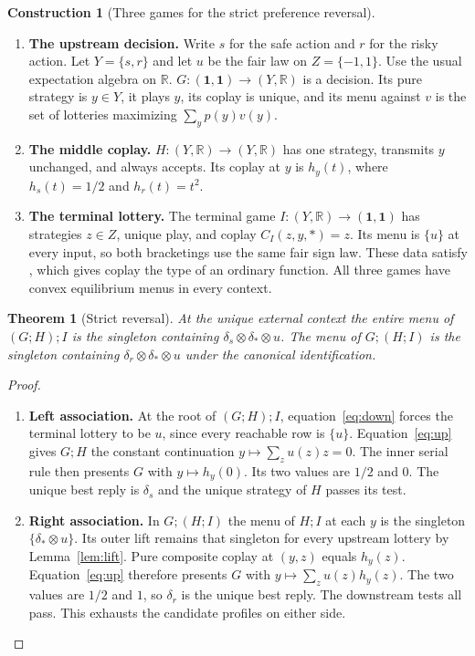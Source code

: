 \documentclass[11pt,a4paper]{article}
\newtheorem{theorem}{Theorem}[section]
\theoremstyle{definition}
\newtheorem*{construction}{Construction}
\newcommand{\one}{\mathbf 1}
\begin{document}
\begin{construction}[Three games for the strict preference reversal]\leavevmode
    \begin{enumerate}[titledsteps]
        \item \textbf{The upstream decision.} Write $s$ for the safe action and $r$ for the risky action. Let $Y=\{s,r\}$ and let $u$ be the fair law on $Z=\{-1,1\}$. Use the usual expectation algebra on $\mathbb R$. $G:(\one,\one)\to(Y,\mathbb R)$ is a decision. Its pure strategy is $y\in Y$, it plays $y$, its coplay is unique, and its menu against $v$ is the set of lotteries maximizing $\sum_y p(y)v(y)$.

        \item \textbf{The middle coplay.} $H:(Y,\mathbb R)\to(Y,\mathbb R)$ has one strategy, transmits $y$ unchanged, and always accepts. Its coplay at $y$ is $h_y(t)$, where $h_s(t)=1/2$ and $h_r(t)=t^2$.

        \item \textbf{The terminal lottery.} The terminal game $I:(Y,\mathbb R)\to(\one,\one)$ has strategies $z\in Z$, unique play, and coplay $C_I(z,y,*)=z$. Its menu is $\{u\}$ at every input, so both bracketings use the same fair sign law. These data satisfy \cite[Definition~3]{gklf}, which gives coplay the type of an ordinary function. All three games have convex equilibrium menus in every context.
    \end{enumerate}
\end{construction}

\begin{theorem}[Strict reversal]\label{thm:reverse}
    At the unique external context the entire menu of $(G;H);I$ is the singleton containing $\delta_s\otimes\delta_*\otimes u$. The menu of $G;(H;I)$ is the singleton containing $\delta_r\otimes\delta_*\otimes u$ under the canonical identification.
\end{theorem}
\begin{proof}\leavevmode
    \begin{enumerate}[titledsteps]
        \item \textbf{Left association.} At the root of $(G;H);I$, equation~\eqref{eq:down} forces the terminal lottery to be $u$, since every reachable row is $\{u\}$. Equation~\eqref{eq:up} gives $G;H$ the constant continuation $y\mapsto\sum_z u(z)z=0$. The inner serial rule then presents $G$ with $y\mapsto h_y(0)$. Its two values are $1/2$ and $0$. The unique best reply is $\delta_s$ and the unique strategy of $H$ passes its test.

        \item \textbf{Right association.} In $G;(H;I)$ the menu of $H;I$ at each $y$ is the singleton $\{\delta_*\otimes u\}$. Its outer lift remains that singleton for every upstream lottery by Lemma~\ref{lem:lift}. Pure composite coplay at $(y,z)$ equals $h_y(z)$. Equation~\eqref{eq:up} therefore presents $G$ with $y\mapsto\sum_z u(z)h_y(z)$. The two values are $1/2$ and $1$, so $\delta_r$ is the unique best reply. The downstream tests all pass. This exhausts the candidate profiles on either side.\qedhere
    \end{enumerate}
\end{proof}
\end{document}
